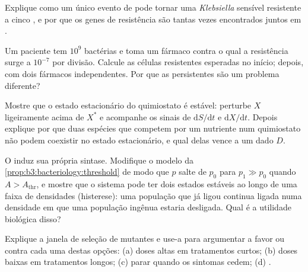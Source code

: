 \begin{exercise}[$\star\star$]\label{exo:b3:bacteriology:8}
Explique como um único evento de  pode tornar uma
\emph{Klebsiella} sensível resistente a cinco , e por que
os genes de resistência são tantas vezes encontrados juntos em
.
\end{exercise}

\begin{exercise}[$\star\star$]\label{exo:b3:bacteriology:9}
Um paciente tem $10^{9}$ bactérias e toma um fármaco contra o qual a
resistência surge a $10^{-7}$ por divisão. Calcule as células
resistentes esperadas no início; depois, com dois fármacos
independentes. Por que as persistentes são um problema diferente?
\end{exercise}

\begin{exercise}[$\star\star\star$]\label{exo:b3:bacteriology:10}
Mostre que o estado estacionário do quimiostato é estável: perturbe $X$
ligeiramente acima de $X^{*}$ e acompanhe os sinais de
$\mathrm{d}S/\mathrm{d}t$ e $\mathrm{d}X/\mathrm{d}t$. Depois explique
por que duas espécies que competem por um nutriente num quimiostato não
podem coexistir no estado estacionário, e qual delas vence a um dado
$D$.
\end{exercise}

\begin{exercise}[$\star\star\star$]\label{exo:b3:bacteriology:11}
O  induz sua própria sintase. Modifique o modelo da
\cref{prop:b3:bacteriology:threshold} de modo que $p$ salte de $p_{0}$
para $p_{1} \gg p_{0}$ quando $A > A_{\text{thr}}$, e mostre que o
sistema pode ter dois estados estáveis ao longo de uma faixa de
densidades (histerese): uma população que já ligou continua ligada numa
densidade em que uma população ingênua estaria desligada. Qual é a
utilidade biológica disso?
\end{exercise}

\begin{exercise}[$\star\star\star$]\label{exo:b3:bacteriology:12}
Explique a janela de seleção de mutantes e use-a para argumentar a
favor ou contra cada uma destas opções: (a) doses altas em tratamentos
curtos; (b) doses baixas em tratamentos longos; (c) parar quando os
sintomas cedem; (d) .
\end{exercise}


